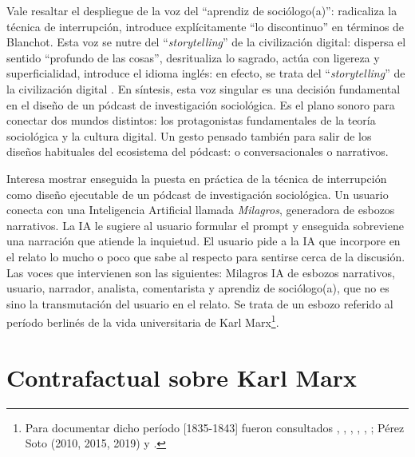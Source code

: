 \documentclass[
  spanish,
  11pt,
  a4paper,
]{scrbook}
\begin{document}
Vale resaltar el despliegue de la voz del ``aprendiz de sociólogo(a)'':
radicaliza la técnica de interrupción, introduce explícitamente ``lo
discontinuo'' en términos de Blanchot. Esta voz se nutre del
``\emph{storytelling}'' de la civilización digital: dispersa el sentido
``profundo de las cosas'', desritualiza lo sagrado, actúa con ligereza y
superficialidad, introduce el idioma inglés: en efecto, se trata del
``\emph{storytelling}'' de la civilización digital
\autocite{Baricco2006,Baricco2019}. En síntesis, esta voz singular es
una decisión fundamental en el diseño de un pódcast de investigación
sociológica. Es el plano sonoro para conectar dos mundos distintos: los
protagonistas fundamentales de la teoría sociológica y la cultura
digital. Un gesto pensado también para salir de los diseños habituales
del ecosistema del pódcast: o conversacionales o narrativos.

Interesa mostrar enseguida la puesta en práctica de la técnica de
interrupción como diseño ejecutable de un pódcast de investigación
sociológica. Un usuario conecta con una Inteligencia Artificial llamada
\emph{Milagros}, generadora de esbozos narrativos. La IA le sugiere al
usuario formular el prompt y enseguida sobreviene una narración que
atiende la inquietud. El usuario pide a la IA que incorpore en el relato
lo mucho o poco que sabe al respecto para sentirse cerca de la
discusión. Las voces que intervienen son las siguientes: Milagros IA de
esbozos narrativos, usuario, narrador, analista, comentarista y aprendiz
de sociólogo(a), que no es sino la transmutación del usuario en el
relato. Se trata de un esbozo referido al período berlinés de la vida
universitaria de Karl Marx\footnote{Para documentar dicho período
  {[}1835-1843{]} fueron consultados \textcite{Attali2019},
  \textcite{Duque1999}, \textcite{Dussel2008}, \textcite{Hegel2011},
  \textcite{Marx1987}, \textcite{McLellan1977}; Pérez Soto (2010, 2015,
  2019) y \textcite{Uroeva2017}.}.

\section*{Contrafactual sobre Karl
Marx}\label{contrafactual-sobre-karl-marx}

\end{document}
